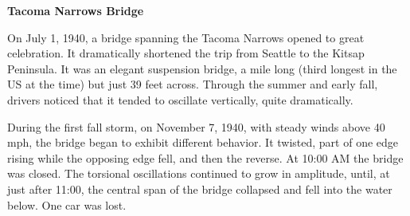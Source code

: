 \documentclass{article}
\theoremstyle{definition}
\begin{document}
\thispagestyle{empty}

\begin{center}{\bf Tacoma Narrows Bridge}\end{center}

On July 1, 1940, a bridge spanning the Tacoma Narrows opened
to great celebration. It dramatically shortened the trip from Seattle
to the Kitsap Peninsula. It was an elegant suspension bridge, a mile
long (third longest in the US at the time) but just 39 feet across.
Through the summer and early fall, drivers noticed that it tended to
oscillate vertically, quite dramatically. 

During the first fall storm, on November 7, 1940, with steady winds
above 40 mph, the bridge began to exhibit different behavior. It
twisted, part of one edge rising while the opposing edge fell, and then
the reverse. At 10:00 AM the bridge was closed. The torsional oscillations continued to grow in amplitude, until, at just after 11:00, the
central span of the bridge collapsed and fell into the water below. One
car was lost.
\end{document}
